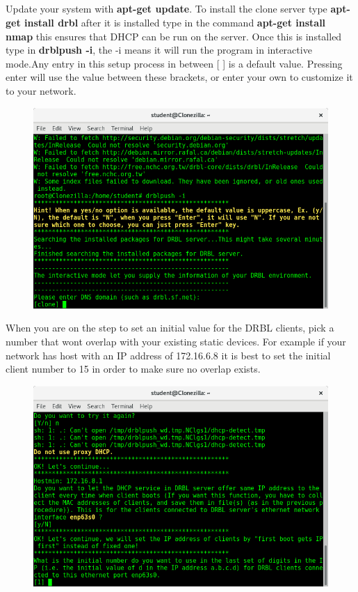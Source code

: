 \documentclass{article}
\begin{document}
\subsection{}
Update your system with \textbf{apt-get update}.
To install the clone server type \textbf{apt-get install drbl} after it is installed type in the command \textbf{apt-get install nmap} this ensures that DHCP can be run on the server. Once this is installed type in \textbf{drblpush -i}, the -i means it will run the program in interactive mode.\newline Any entry in this setup process in between [ ] is a default value. Pressing enter will use the value between these brackets, or enter your own to customize it to your network.
\begin{figure}[h]
	\centering
	\includegraphics[width=1\linewidth]{"Screenshots-clone-server/Screenshot from 2018-03-10 13-36-36"}
\end{figure}
\newpage
When you are on the step to set an initial value for the DRBL clients, pick a number that wont overlap with your existing static devices. For example if your network has host with an IP address of 172.16.6.8 it is best to set the initial client number to 15 in order to make sure no overlap exists.
\begin{figure}[h]
	\centering
	\includegraphics[width=1\linewidth]{"Screenshots-clone-server/Screenshot from 2018-03-10 13-39-10"}
\end{figure}
\end{document}
